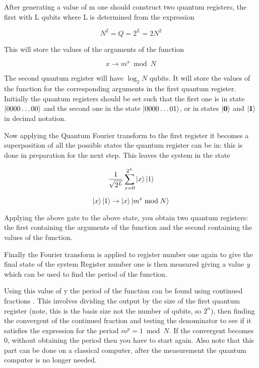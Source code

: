 After generating a value of m one should construct two quantum registers, the first with L qubits where L is determined from the expression 

\begin{equation}
 N^2=Q=2^L=2N^2
\end{equation}

This will store the values of the arguments of the function 

\begin{equation}
 x \rightarrow m^x \bmod N
\end{equation}


The second quantum register will have \(\log_2 N\) qubits. It will store the values of the function for the corresponding arguments in the first quantum register. Initially the quantum registers should be set such that the first one is in state \( \left| 0000\ldots 00 \right> \) and the second one in the state \( \left| 0000\ldots 01 \right> \), or in states \( \left| \mathbf{0} \right> \) and \( \left| \mathbf{1} \right> \) in decimal notation.

Now applying the Quantum Fourier transform to the first register it becomes a superposition of all the possible states the quantum register can be in: this is done in preparation for the next step. This leaves the system in the state 

\begin{equation}
 \frac{1}{\sqrt{2^L}}\sum_{x=0}^{2^L} \left| x \right>\left| 1 \right>
\end{equation}

\begin{equation}
 \left| x \right>\left| 1 \right> \rightarrow \left| x \right>\left| m^x \bmod N \right>
\end{equation}

Applying the above gate to the above state, you obtain two quantum registers: the first containing the arguments of the function and the second containing the values of the function.

Finally the Fourier transform is applied to register number one again to give the final state of the system Register number one is then measured giving a value \emph{y} which can be used to find the period of the function.

Using this value of y the period of the function can be found using continued fractions \cite{lomo2002}. This involves dividing the output by the size of the first quantum register (note, this is the basis size not the number of qubits, so \(2^n\)), then finding the convergent of the continued fraction and testing the denominator to see if it satisfies the expression for the  period \(m^p = 1 \bmod N \). If the convergent becomes 0, without obtaining the period then you have to start again.  Also note that this part can be done on a classical computer, after the measurement the quantum computer is no longer needed. 

